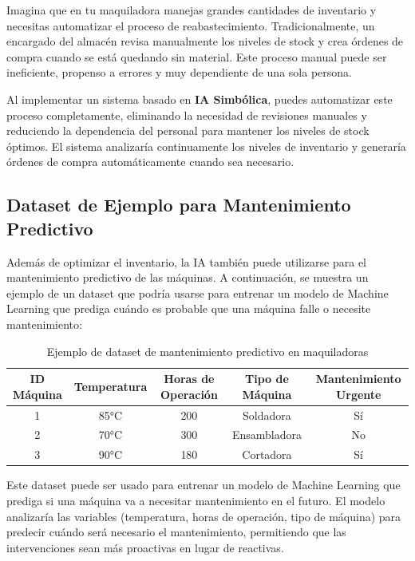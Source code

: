 Imagina que en tu maquiladora manejas grandes cantidades de inventario y necesitas automatizar el proceso de reabastecimiento. Tradicionalmente, un encargado del almacén revisa manualmente los niveles de stock y crea órdenes de compra cuando se está quedando sin material. Este proceso manual puede ser ineficiente, propenso a errores y muy dependiente de una sola persona.

Al implementar un sistema basado en \textbf{IA Simbólica}, puedes automatizar este proceso completamente, eliminando la necesidad de revisiones manuales y reduciendo la dependencia del personal para mantener los niveles de stock óptimos. El sistema analizaría continuamente los niveles de inventario y generaría órdenes de compra automáticamente cuando sea necesario.

\subsection{Dataset de Ejemplo para Mantenimiento Predictivo}\label{dataset-mantenimiento-predictivo}

Además de optimizar el inventario, la IA también puede utilizarse para el mantenimiento predictivo de las máquinas. A continuación, se muestra un ejemplo de un dataset que podría usarse para entrenar un modelo de Machine Learning que prediga cuándo es probable que una máquina falle o necesite mantenimiento:

\begin{table}[htbp]
\centering
\begin{tabular}{|c|c|c|c|c|}
\hline
ID Máquina & Temperatura & Horas de Operación & Tipo de Máquina & Mantenimiento Urgente \\
\hline
1 & 85°C & 200 & Soldadora & Sí \\
2 & 70°C & 300 & Ensambladora & No \\
3 & 90°C & 180 & Cortadora & Sí \\
\hline
\end{tabular}
\caption{Ejemplo de dataset de mantenimiento predictivo en maquiladoras}
\label{tab:mantenimiento-predictivo}
\end{table}

Este dataset puede ser usado para entrenar un modelo de Machine Learning que prediga si una máquina va a necesitar mantenimiento en el futuro. El modelo analizaría las variables (temperatura, horas de operación, tipo de máquina) para predecir cuándo será necesario el mantenimiento, permitiendo que las intervenciones sean más proactivas en lugar de reactivas.

